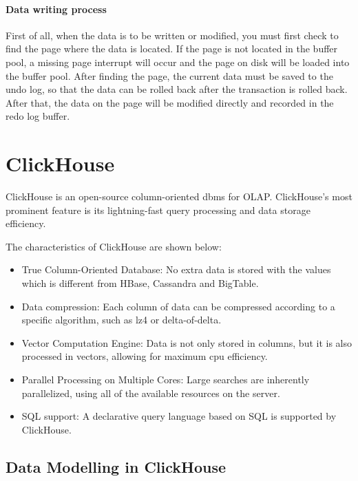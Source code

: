 \paragraph{Data writing process}
First of all, when the data is to be written or modified, you must first check to find the page where the data is located. If the page is not located in the buffer pool, a missing page interrupt will occur and the page on disk will be loaded into the buffer pool. After finding the page, the current data must be saved to the undo log, so that the data can be rolled back after the transaction is rolled back. After that, the data on the page will be modified directly and recorded in the redo log buffer\cite{mysql_page}.


\section{ClickHouse}

ClickHouse is an open-source column-oriented \ac{dbms} for OLAP. ClickHouse's most prominent feature is its lightning-fast query processing and data storage efficiency.

The characteristics of ClickHouse are shown below:

\begin{itemize}
    \item True Column-Oriented Database: No extra data is stored with the values which is different from HBase, Cassandra and BigTable\cite{clickhouse_feature}.
    \item Data compression: Each column of data can be compressed according to a specific algorithm, such as lz4 or delta-of-delta.
    \item Vector Computation Engine: Data is not only stored in columns, but it is also processed in vectors, allowing for maximum \ac{cpu} efficiency\cite{clickhouse_feature}.
    \item Parallel Processing on Multiple Cores: Large searches are inherently parallelized, using all of the available resources on the server\cite{clickhouse_feature}.
    \item SQL support: A declarative query language based on SQL is supported by ClickHouse\cite{clickhouse_feature}.
\end{itemize}

\subsection{Data Modelling in ClickHouse}

